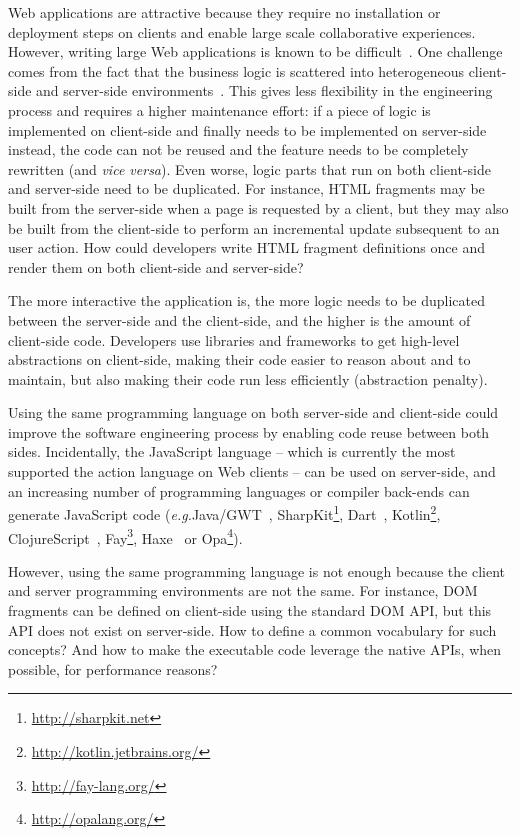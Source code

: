\documentclass[preprint]{sigplanconf}
\newcommand{\eg}{\emph{e.g.}}
\begin{document}
Web applications are attractive because they require no installation or deployment steps on clients and enable large
scale collaborative experiences. However, writing large Web applications is known to be
difficult~\cite{Mikkonen08_SpaghettiJs,Preciado05_RIAMethodologyNecessity}. One challenge comes from the fact
that the business logic is scattered into heterogeneous client-side and server-side
environments~\cite{Echeverria09_RIA,Kuuskeri09_PartitioningClientServer}. This gives less flexibility in the
engineering process and requires a higher maintenance effort: if a piece of logic is implemented on client-side and
finally needs to be implemented on server-side instead, the code can not be reused and the feature needs to be
completely rewritten (and \emph{vice versa}). Even worse, logic parts that run on both client-side and server-side
need to be duplicated. For instance, HTML fragments may be built from the server-side when a page is requested by a
client, but they may also be built from the client-side to perform an incremental update subsequent to an user
action. How could developers write HTML fragment definitions once and render them on both client-side and
server-side?

The more interactive the application is, the more logic needs to be duplicated between the server-side
and the client-side, and the higher is the amount of client-side code. Developers use libraries and frameworks to get
high-level abstractions on client-side, making their code easier to reason about and to maintain, but also making
their code run less efficiently (abstraction penalty).

Using the same programming language on both server-side and client-side could improve the software engineering
process by enabling code reuse between both sides. Incidentally, the JavaScript language -- which is currently the
most supported the action language on Web clients -- can be used on server-side, and an increasing number of
programming languages or compiler back-ends can generate JavaScript code (\eg Java/GWT~\cite{Chaganti07_GWT},
SharpKit\footnote{\href{http://sharpkit.net}{http://sharpkit.net}}, Dart~\cite{Griffith11_Dart},
Kotlin\footnote{\href{http://kotlin.jetbrains.org/}{http://kotlin.jetbrains.org/}},
ClojureScript~\cite{McGranaghan11_ClojureScript}, Fay\footnote{\href{http://fay-lang.org/}{http://fay-lang.org/}},
Haxe~\cite{Cannasse08_HaXe} or Opa\footnote{\href{http://opalang.org/}{http://opalang.org/}}).

However, using the same programming language is not enough because the client and server programming environments
are not the same. For instance, DOM fragments can be defined on client-side using the standard DOM API, but this
API does not exist on server-side. How to define a common vocabulary for such concepts? And how to make the
executable code leverage the native APIs, when possible, for performance reasons?
\end{document}
